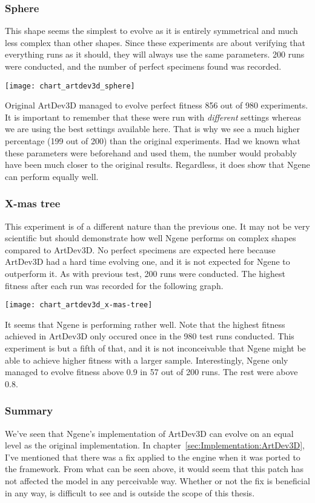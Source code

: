 \subsubsection{Sphere}
This shape seems the simplest to evolve as it is entirely symmetrical and much less complex than other shapes. Since these experiments are about verifying that everything runs as it should, they will always use the same parameters. 200 runs were conducted, and the number of perfect specimens found was recorded.

\begin{center}\texttt{[image: chart\_artdev3d\_sphere]}\end{center}

Original ArtDev3D managed to evolve perfect fitness 856 out of 980 experiments. It is important to remember that these were run with \emph{different} settings whereas we are using the best settings available here. That is why we see a much higher percentage (199 out of 200) than the original experiments. Had we known what these parameters were beforehand and used them, the number would probably have been much closer to the original results. Regardless, it does show that Ngene can perform equally well.

\subsubsection{X-mas tree}
This experiment is of a different nature than the previous one. It may not be very scientific but should demonstrate how well Ngene performs on complex shapes compared to ArtDev3D. No perfect specimens are expected here because ArtDev3D had a hard time evolving one, and it is not expected for Ngene to outperform it. As with previous test, 200 runs were conducted. The highest fitness after each run was recorded for the following graph.

\begin{center}\texttt{[image: chart\_artdev3d\_x-mas-tree]}\end{center}

It seems that Ngene is performing rather well. Note that the highest fitness achieved in ArtDev3D only occured once in the 980 test runs conducted. This experiment is but a fifth of that, and it is not inconceivable that Ngene might be able to achieve higher fitness with a larger sample. Interestingly, Ngene only managed to evolve fitness above 0.9 in 57 out of 200 runs. The rest were above 0.8.

\subsubsection{Summary}
We've seen that Ngene's implementation of ArtDev3D can evolve on an equal level as the original implementation. In chapter~\ref{sec:Implementation:ArtDev3D}, I've mentioned that there was a fix applied to the engine when it was ported to the framework. From what can be seen above, it would seem that this patch has not affected the model in any perceivable way. Whether or not the fix is beneficial in any way, is difficult to see and is outside the scope of this thesis.



